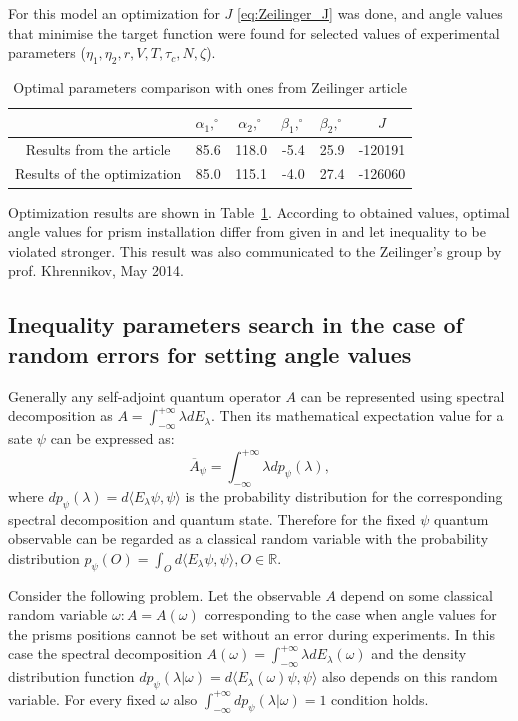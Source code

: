 \documentclass[%
master,         %
subf,           %
href,           %
colorlinks=true %
]{disser}
\numberwithin{equation}{section}
\numberwithin{figure}{section}
\begin{document}
For this model an optimization for $J$ \eqref{eq:Zeilinger_J} was done, and angle values that
minimise the target function were found for selected values of experimental parameters 
($\eta_1, \eta_2, r, V, T, \tau_c, N, \zeta$).

\begin{table}
\begin{tabular}{|c|c|c|c|c|c|}
\hline 
 & $\alpha_1, ^\circ$ & $\alpha_2, ^\circ$ & $\beta_1, ^\circ$ & $\beta_2, ^\circ$ & $J$ \\ 
\hline 
Results from the article & 85.6 & 118.0 & -5.4 & 25.9 & -120191 \\ 
\hline 
Results of the optimization & 85.0 & 115.1 & -4.0 & 27.4 & -126060 \\ 
\hline 
\end{tabular}
\caption{Optimal parameters comparison with ones from Zeilinger article \cite{Zeilinger}}
\label{tab:Zeilinger_parameters}
\end{table}

Optimization results are shown in Table~\ref{tab:Zeilinger_parameters}. According to obtained values, 
optimal angle values for prism installation differ from given in \cite{Zeilinger} and let inequality to be violated stronger. This result was also communicated to the Zeilinger's group by prof. Khrennikov, May 2014. 

\clearpage

\subsection{Inequality parameters search in the case of random errors for setting angle values}
Generally any self-adjoint quantum operator $A$ can be represented using spectral decomposition as 
$A = \int_{-\infty}^{+\infty}\lambda dE_\lambda$. Then its mathematical expectation value for a sate $\psi$ 
 can be expressed as:
\[
\overline{A}_\psi = \int_{-\infty}^{+\infty}\lambda dp_\psi (\lambda),
\]
where $dp_\psi (\lambda) = d\langle E_\lambda\psi, \psi\rangle$ is the probability distribution for the corresponding spectral decomposition and quantum state. Therefore for the fixed $\psi$ quantum observable can be regarded as a classical random variable with the probability distribution
$p_\psi (O) = \int_O d\langle E_\lambda\psi, \psi\rangle, O\in \mathbb{R}$.

Consider the following problem. Let the observable $A$ depend on some classical random variable 
$\omega: A = A(\omega)$ corresponding to the case when angle values for the prisms positions 
cannot be set without an error during experiments. In this case the spectral decomposition 
$A(\omega) = \int_{-\infty}^{+\infty}\lambda dE_\lambda(\omega)$ and the density distribution function 
$dp_\psi (\lambda|\omega) = d\langle E_\lambda(\omega)\psi, \psi\rangle$ also depends on 
this random variable. For every fixed $\omega$ also 
$\int_{-\infty}^{+\infty}dp_\psi (\lambda|\omega) = 1$ condition holds.
\end{document}
